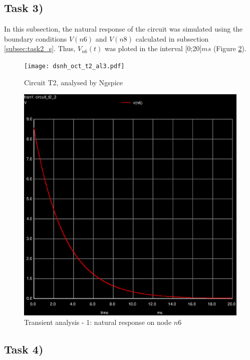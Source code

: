 \subsection{Task 3)}
\label{subsec:task3_s}

In this subsection, the natural response of the circuit was simulated using the boundary conditions
$V(n6)$ and $V(n8)$ calculated in subsection \ref{subsec:task2_s}. Thus, $V_{n6}(t)$ was ploted in the 
interval [0;20]$ms$ (Figure \ref{fig:trans-1}).

\begin{figure}[ht]
	\centering
	\texttt{[image: dsnh\_oct\_t2\_al3.pdf]}
	\caption{Circuit T2, analysed by Ngspice}
\label{fig:Dsnh_sim_t2}
\end{figure}

\begin{figure}[ht]
	\centering
	\includegraphics[width=0.55\linewidth]{trans-1.eps}
	\caption{Transient analysis - 1: natural response on node $n6$}
\label{fig:trans-1}
\end{figure}


\subsection{Task 4)}
\label{subsec:task4_s}

